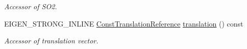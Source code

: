\begin{DoxyCompactItemize}
\begin{DoxyCompactList}\small\item\em Accessor of S\+O2. \end{DoxyCompactList}\item 
E\+I\+G\+E\+N\+\_\+\+S\+T\+R\+O\+N\+G\+\_\+\+I\+N\+L\+I\+NE \hyperlink{class_eigen_1_1_map_3_01const_01_sophus_1_1_s_e2_group_3_01___scalar_01_4_00_01___options_01_4_a1f66099d992183637c4ac5bb1792f02d}{Const\+Translation\+Reference} \hyperlink{class_eigen_1_1_map_3_01const_01_sophus_1_1_s_e2_group_3_01___scalar_01_4_00_01___options_01_4_a55ae0805a31a76a51d78f9ce33eb299a}{translation} () const \hypertarget{class_eigen_1_1_map_3_01const_01_sophus_1_1_s_e2_group_3_01___scalar_01_4_00_01___options_01_4_a55ae0805a31a76a51d78f9ce33eb299a}{}\label{class_eigen_1_1_map_3_01const_01_sophus_1_1_s_e2_group_3_01___scalar_01_4_00_01___options_01_4_a55ae0805a31a76a51d78f9ce33eb299a}

\begin{DoxyCompactList}\small\item\em Accessor of translation vector. \end{DoxyCompactList}\end{DoxyCompactItemize}
